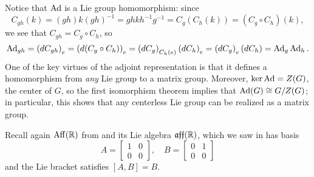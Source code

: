 Notice that $\operatorname{Ad}$ is a Lie group homomorphism: since 
\[
	C_{gh}(k) = (gh)k(gh)^{-1} = ghkh^{-1}g^{-1} = C_g(C_h(k)) = (C_g \circ C_h)(k),
\]
we see that $C_{gh} = C_g \circ C_h$, so
\[
	\operatorname{Ad}_{gh} = \left(dC_{gh}\right)_e = \left(d(C_g \circ C_h)\right)_e = \left(dC_g\right)_{C_h(e)} \left(dC_h\right)_e = \left(dC_g\right)_e \left(dC_h\right) = \operatorname{Ad}_g \operatorname{Ad}_h.
\]
One of the key virtues of the adjoint representation is that it defines a homomorphism from \emph{any} Lie group to a matrix group. Moreover, $\ker \operatorname{Ad} = Z(G)$, the center of $G$, so the first isomorphism theorem implies that $\operatorname{Ad}(G) \cong G/Z(G)$; in particular, this shows that any centerless Lie group can be realized as a matrix group.

\begin{example}\label{ex:affine adjoint rep}
	Recall again $\operatorname{Aff}(\mathbb{R})$ from  and its Lie algebra $\mathfrak{aff}(\mathbb{R})$, which we saw in  has basis
	\[
		A = \begin{bmatrix} 1 & 0 \\ 0 & 0 \end{bmatrix}, \quad B = \begin{bmatrix} 0 & 1 \\ 0 & 0 \end{bmatrix}
	\]
	and the Lie bracket satisfies $[A,B] = B$.
	

\end{example}
